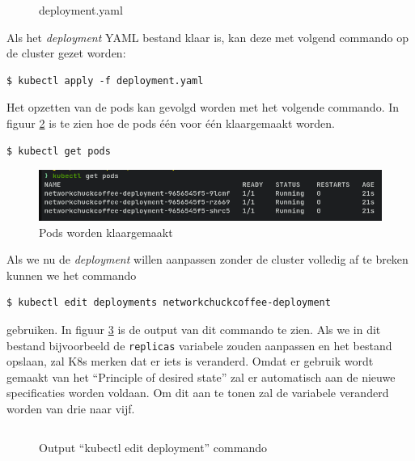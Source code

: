 \begin{figure}[h] 
	\centering
	\inputminted[fontsize=\footnotesize,linenos]{yaml}{files/deployment.yaml}
	\caption{deployment.yaml}
	\label{basicDeploy}
\end{figure}

Als het \textit{deployment} YAML bestand klaar is, kan deze met volgend commando op de cluster gezet worden:
\begin{verbatim} 
$ kubectl apply -f deployment.yaml
\end{verbatim}
Het opzetten van de pods kan gevolgd worden met het volgende commando. In figuur \ref{fig:getPodsDeployment1} is te zien hoe de pods één voor één klaargemaakt worden.
\begin{verbatim} 
$ kubectl get pods
\end{verbatim}

\begin{figure}[h]
	\centering
	\includegraphics[width=\linewidth]{img/kubectlGetPodsDeployment1.png}
	\caption{Pods worden klaargemaakt}
	\label{fig:getPodsDeployment1}
\end{figure}

Als we nu de \textit{deployment} willen aanpassen zonder de cluster volledig af te breken kunnen we het commando 
\begin{verbatim} 
$ kubectl edit deployments networkchuckcoffee-deployment
\end{verbatim}
gebruiken. In figuur \ref{editDeploy1} is de output van dit commando te zien. Als we in dit bestand bijvoorbeeld de \verb|replicas| variabele zouden aanpassen en het bestand opslaan, zal K8s merken dat er iets is veranderd. Omdat er gebruik wordt gemaakt van het ``Principle of desired state'' zal er automatisch aan de nieuwe specificaties worden voldaan. Om dit aan te tonen zal de variabele veranderd worden van drie naar vijf.


\begin{figure}[h] 
	\inputminted[fontsize=\footnotesize,linenos]{yaml}{files/editDeployment.yaml}
	\caption{Output ``kubectl edit deployment'' commando}
	\label{editDeploy1}
\end{figure}

